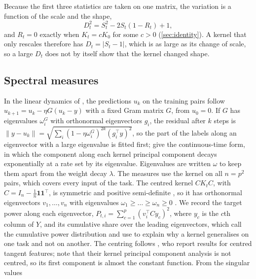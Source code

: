 \documentclass[a4paper,11pt]{article} %
\begin{document}
Because the first three statistics are taken on one matrix, the variation is a
function of the scale and the shape,
\begin{equation}
  D_t^2 = S_t^2 - 2S_t(1-R_t) + 1 ,
  \label{eq:identity}
\end{equation}
and $R_t=0$ exactly when $K_t=cK_0$ for some $c>0$
(\cref{sec:identity}). A kernel that only rescales therefore has
$D_t=\lvert S_t-1\rvert$, which is as large as its change of scale, so a large
$D_t$ does not by itself show that the kernel changed shape.

\subsection{Spectral measures}
\label{sec:spectra}

In the linear dynamics of \citet{aroraFinegrainedAnalysisOptimization2019}, the
predictions $u_k$ on the training pairs follow
$u_{k+1}=u_k-\eta G(u_k-y)$ with a fixed Gram matrix $G$, from $u_0=0$. If $G$
has eigenvalues $\omega^G_i$ with orthonormal eigenvectors $g_i$, the residual
after $k$ steps is
$\lVert y-u_k\rVert=\sqrt{\sum_{i}(1-\eta\omega^G_i)^{2k}(g_i^\top y)^2}$, so
the part of the labels along an eigenvector with a large eigenvalue is fitted
first; \citet{jacotNeuralTangentKernel2020} give the continuous-time form, in
which the component along each kernel principal component decays exponentially
at a rate set by its eigenvalue. Eigenvalues are written $\omega$ to keep them
apart from the weight decay $\lambda$. The measures use the kernel on all
$n=p^2$ pairs, which covers every input of the task. The centred kernel
$CK_{t}C$, with $C=I_n-\frac{1}{n}\mathbf{1}\mathbf{1}^\top$, is symmetric and
positive semi-definite
\citep{cortesAlgorithmsLearningKernels2024}, so it has orthonormal eigenvectors
$v_1,\dots,v_n$ with eigenvalues $\omega_1\ge\dots\ge\omega_n\ge0$
\citep{axlerLinearAlgebraDone2024}. We record the target power along each
eigenvector, $P_{t,i}=\sum_{c=1}^{p}(v_i^\top Cy_c)^2$, where $y_c$ is the
$c$th column of $Y$, and its cumulative share over the leading eigenvectors,
which \citet{canatarSpectralBiasTaskModel2021} call the cumulative power
distribution and use to explain why a kernel generalises on one task and not on
another. The centring follows \citet{baratinImplicitRegularizationNeural2021},
who report results for centred tangent features;
\citet{jacotNeuralTangentKernel2020} note that their kernel principal
component analysis is not centred, so its first component is almost the
constant function. From the singular values
\end{document}

